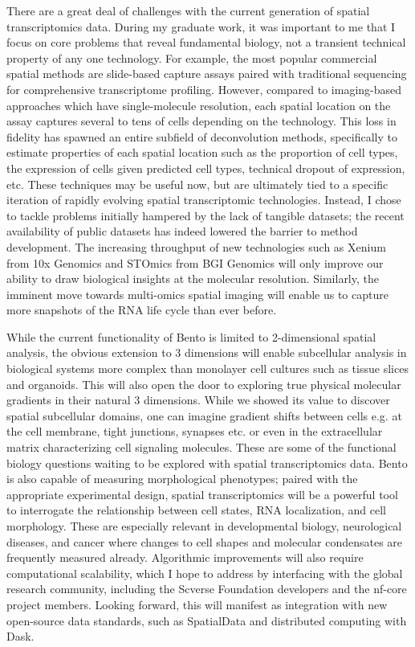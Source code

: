 \begin{dissertationepilogue}
    There are a great deal of challenges with the current generation of spatial transcriptomics data. During my graduate work, it was important to me that I focus on core problems that reveal fundamental biology, not a transient technical property of any one technology. For example, the most popular commercial spatial methods are slide-based capture assays paired with traditional sequencing for comprehensive transcriptome profiling. However, compared to imaging-based approaches which have single-molecule resolution, each spatial location on the assay captures several to tens of cells depending on the technology. This loss in fidelity has spawned an entire subfield of deconvolution methods, specifically to estimate properties of each spatial location such as the proportion of cell types, the expression of cells given predicted cell types, technical dropout of expression, etc. These techniques may be useful now, but are ultimately tied to a specific iteration of rapidly evolving spatial transcriptomic technologies. Instead, I chose to tackle problems initially hampered by the lack of tangible datasets; the recent availability of public datasets has indeed lowered the barrier to method development. The increasing throughput of new technologies such as Xenium from 10x Genomics and STOmics from BGI Genomics will only improve our ability to draw biological insights at the molecular resolution. Similarly, the imminent move towards multi-omics spatial imaging will enable us to capture more snapshots of the RNA life cycle than ever before.
    
    While the current functionality of Bento is limited to 2-dimensional spatial analysis, the obvious extension to 3 dimensions will enable subcellular analysis in biological systems more complex than monolayer cell cultures such as tissue slices and organoids. This will also open the door to exploring true physical molecular gradients in their natural 3 dimensions. While we showed its value to discover spatial subcellular domains, one can imagine gradient shifts between cells e.g. at the cell membrane, tight junctions, synapses etc. or even in the extracellular matrix characterizing cell signaling molecules. These are some of the functional biology questions waiting to be explored with spatial transcriptomics data. Bento is also capable of measuring morphological phenotypes; paired with the appropriate experimental design, spatial transcriptomics will be a powerful tool to interrogate the relationship between cell states, RNA localization, and cell morphology. These are especially relevant in developmental biology, neurological diseases, and cancer where changes to cell shapes and molecular condensates are frequently measured already. Algorithmic improvements will also require computational scalability, which I hope to address by interfacing with the global research community, including the Scverse Foundation\cite{virshupScverseProjectProvides2023} developers and the nf-core project members. Looking forward, this will manifest as integration with new open-source data standards, such as SpatialData and distributed computing with Dask. 
    


\end{dissertationepilogue}
